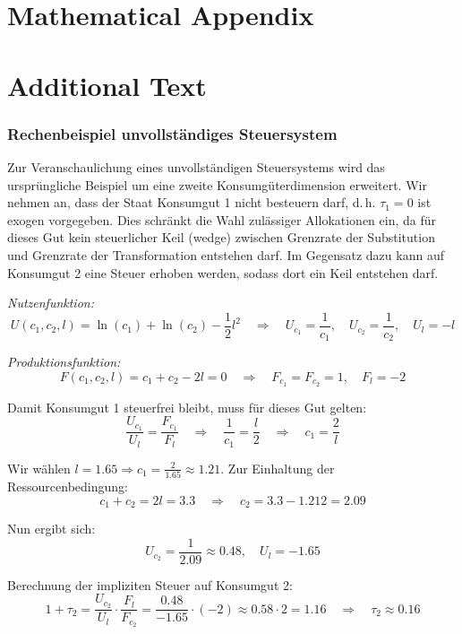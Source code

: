 \section{Mathematical Appendix}






\section{Additional Text}


\subsubsection{Rechenbeispiel unvollständiges Steuersystem}

\label{app:rechenbeispiel_steuersystem}

Zur Veranschaulichung eines unvollständigen Steuersystems wird das ursprüngliche Beispiel um eine zweite Konsumgüterdimension erweitert. Wir nehmen an, dass der Staat Konsumgut 1 nicht besteuern darf, d.\,h. \( \tau_1 = 0 \) ist exogen vorgegeben. Dies schränkt die Wahl zulässiger Allokationen ein, da für dieses Gut kein steuerlicher Keil (wedge) zwischen Grenzrate der Substitution und Grenzrate der Transformation entstehen darf. Im Gegensatz dazu kann auf Konsumgut 2 eine Steuer erhoben werden, sodass dort ein Keil entstehen darf.

\textit{Nutzenfunktion:}
\[
U(c_1, c_2, l) = \ln(c_1) + \ln(c_2) - \frac{1}{2}l^2
\quad \Rightarrow \quad U_{c_1} = \frac{1}{c_1}, \quad U_{c_2} = \frac{1}{c_2}, \quad U_l = -l
\]

\textit{Produktionsfunktion:}
\[
F(c_1, c_2, l) = c_1 + c_2 - 2l = 0
\quad \Rightarrow \quad F_{c_1} = F_{c_2} = 1, \quad F_l = -2
\]

Damit Konsumgut 1 steuerfrei bleibt, muss für dieses Gut gelten:
\[
\frac{U_{c_1}}{U_l} = \frac{F_{c_1}}{F_l}
\quad \Rightarrow \quad \frac{1}{c_1} = \frac{l}{2}
\quad \Rightarrow \quad c_1 = \frac{2}{l}
\]

Wir wählen \( l = 1.65 \Rightarrow c_1 = \frac{2}{1.65} \approx 1.21 \).  
Zur Einhaltung der Ressourcenbedingung:
\[
c_1 + c_2 = 2l = 3.3 \quad \Rightarrow \quad c_2 = 3.3 - 1.212 = 2.09
\]

Nun ergibt sich:
\[
U_{c_2} = \frac{1}{2.09} \approx 0.48, \quad U_l = -1.65
\]

Berechnung der impliziten Steuer auf Konsumgut 2:
\[
1 + \tau_2 = \frac{U_{c_2}}{U_l} \cdot \frac{F_l}{F_{c_2}} = \frac{0.48}{-1.65} \cdot (-2) \approx 0.58 \cdot 2 = 1.16
\quad \Rightarrow \quad \tau_2 \approx 0.16
\]

